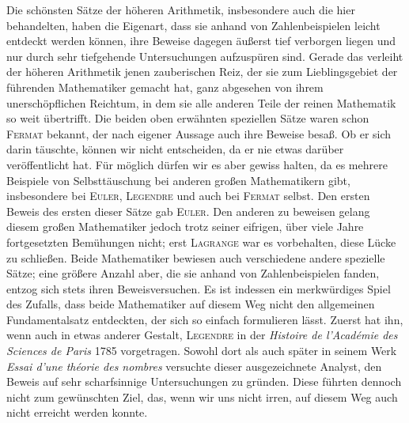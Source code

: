 Die schönsten Sätze der höheren Arithmetik, insbesondere auch die hier behandelten, haben die Eigenart, dass sie anhand von Zahlenbeispielen leicht entdeckt werden können, ihre Beweise dagegen äußerst tief verborgen liegen und nur durch sehr tiefgehende Untersuchungen aufzuspüren sind. Gerade das verleiht der höheren Arithmetik jenen zauberischen Reiz, der sie zum Lieblingsgebiet der führenden Mathematiker gemacht hat, ganz abgesehen von ihrem unerschöpflichen Reichtum, in dem sie alle anderen Teile der reinen Mathematik so weit übertrifft. Die beiden oben erwähnten speziellen Sätze waren schon \textsc{Fermat} bekannt, der nach eigener Aussage auch ihre Beweise besaß. Ob er sich darin täuschte, können wir nicht entscheiden, da er nie etwas darüber veröffentlicht hat. Für möglich dürfen wir es aber gewiss halten, da es mehrere Beispiele von Selbsttäuschung bei anderen großen Mathematikern gibt, insbesondere bei \textsc{Euler}, \textsc{Legendre} und auch bei \textsc{Fermat} selbst. Den ersten Beweis des ersten dieser Sätze gab \textsc{Euler}. Den anderen zu beweisen gelang diesem großen Mathematiker jedoch trotz seiner eifrigen, über viele Jahre fortgesetzten Bemühungen nicht; erst \textsc{Lagrange} war es vorbehalten, diese Lücke zu schließen. Beide Mathematiker bewiesen auch verschiedene andere spezielle Sätze; eine größere Anzahl aber, die sie anhand von Zahlenbeispielen fanden, entzog sich stets ihren Beweisversuchen. Es ist indessen ein merkwürdiges Spiel des Zufalls, dass beide Mathematiker auf diesem Weg nicht den allgemeinen Fundamentalsatz entdeckten, der sich so einfach formulieren lässt. Zuerst hat ihn, wenn auch in etwas anderer Gestalt, \textsc{Legendre} in der \emph{Histoire de l'Académie des Sciences de Paris} 1785 vorgetragen. Sowohl dort als auch später in seinem Werk \emph{Essai d'une théorie des nombres} versuchte
%
dieser ausgezeichnete Analyst, den Beweis auf sehr scharfsinnige Untersuchungen zu gründen. Diese führten dennoch nicht zum gewünschten Ziel, das, wenn wir uns nicht irren, auf diesem Weg auch nicht erreicht werden konnte.

